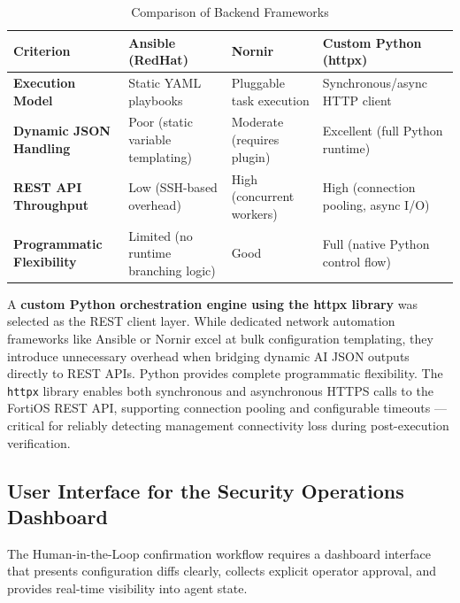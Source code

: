 \begin{table}[htbp]
    \small
    \centering
    \renewcommand{\arraystretch}{1.4}
    \begin{tabular}{|p{3.0cm}|p{3.5cm}|p{3.5cm}|p{3.8cm}|}
        \hline
        \textbf{Criterion} & \textbf{Ansible (RedHat)} & \textbf{Nornir} & \textbf{Custom Python (httpx)} \\
        \hline
        \textbf{Execution Model} & Static YAML playbooks & Pluggable task execution & Synchronous/async HTTP client \\
        \hline
        \textbf{Dynamic JSON Handling} & Poor (static variable templating) & Moderate (requires plugin) & Excellent (full Python runtime) \\
        \hline
        \textbf{REST API Throughput} & Low (SSH-based overhead) & High (concurrent workers) & High (connection pooling, async I/O) \\
        \hline
        \textbf{Programmatic Flexibility} & Limited (no runtime branching logic) & Good & Full (native Python control flow) \\
        \hline
    \end{tabular}
    \caption{Comparison of Backend Frameworks}
    \label{tab:backend_frameworks}
\end{table}

A \textbf{custom Python orchestration engine using the httpx library} was selected as the REST client layer. While dedicated network automation frameworks like Ansible or Nornir excel at bulk configuration templating, they introduce unnecessary overhead when bridging dynamic AI JSON outputs directly to REST APIs. Python provides complete programmatic flexibility. The \texttt{httpx} library enables both synchronous and asynchronous HTTPS calls to the FortiOS REST API, supporting connection pooling and configurable timeouts — critical for reliably detecting management connectivity loss during post-execution verification.

\subsection{User Interface for the Security Operations Dashboard}
The Human-in-the-Loop confirmation workflow requires a dashboard interface that presents configuration diffs clearly, collects explicit operator approval, and provides real-time visibility into agent state.

